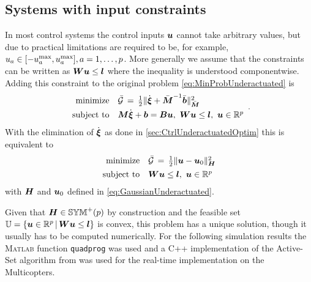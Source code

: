 \subsection{Systems with input constraints}
In most control systems the control inputs $\sysInput$ cannot take arbitrary values, but due to practical limitations are required to be, for example, $\sysInputCoeff{a} \in [-\sysInputCoeff{a}^{\idxMax}, \sysInputCoeff{a}^{\idxMax}], a=1,\ldots,\numInputs$.
More generally we assume that the constraints can be written as $\sysInputConstMat \sysInput \leq \sysInputConstVec$ where the inequality is understood componentwise.
Adding this constraint to the original problem \eqref{eq:MinProbUnderactuated} is
\begin{align}\label{eq:MinProbUnderactuatedInputConst}
 \begin{array}{rl}
  \text{minimize} & \GaussianConstraintC \, = \, \tfrac{1}{2} \norm[\sysInertiaMatC]{\sysVeld + \sysInertiaMatC^{-1} \sysForceC}^2
  \\[1ex]
  \text{subject to} & \sysInertiaMat \sysVeld + \sysForce = \sysInputMat \sysInput, \ \sysInputConstMat \sysInput \leq \sysInputConstVec, \ \sysInput \in \RealNum^\numInputs 
 \end{array}
 .
\end{align}
With the elimination of $\sysVeld$ as done in \autoref{sec:CtrlUnderactuatedOptim} this is equivalent to
\begin{align}\label{eq:MinProbInputConstraints}
 \begin{array}{rl}
  \text{minimize} & \GaussianConstraintC \, = \, \tfrac{1}{2} \norm[\mat{H}]{\sysInput - \sysInput_0}^2 %
  \\[1ex]
  \text{subject to} &\sysInputConstMat \sysInput \leq \sysInputConstVec, \ \sysInput \in \RealNum^\numInputs 
 \end{array}
\end{align}
with $\mat{H}$ and $\sysInput_0$ defined in \eqref{eq:GaussianUnderactuated}.

Given that $\mat{H} \in \SymMatP(\numInputs)$ by construction and the feasible set $\mathbb{U} = \{ \sysInput \in \RealNum^\numInputs \, | \, \sysInputConstMat \sysInput \leq \sysInputConstVec \}$ is convex, this problem has a unique solution, though it usually has to be computed numerically.
For the following simulation results the \textsc{Matlab} function \texttt{quadprog} was used and a C++ implementation of the Active-Set algorithm from \cite[Algorithm 16.3]{Nocedal:NumericalOptimization} was used for the real-time implementation on the Multicopters.

